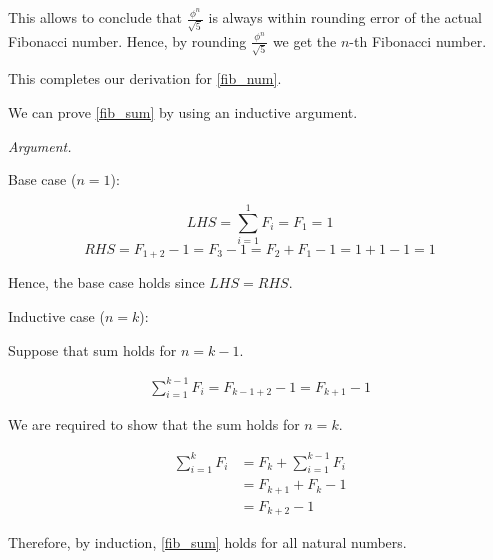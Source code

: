 \documentclass[12pt]{article}
\begin{document}
This allows to conclude that $\frac{\phi^n}{\sqrt{5}}$ is always
within rounding error of the actual Fibonacci number. Hence, by
rounding $\frac{\phi^n}{\sqrt{5}}$ we get the $n$-th Fibonacci
number.

This completes our derivation for \ref{fib_num}.

\vspace{1em}

We can prove \ref{fib_sum} by using an inductive argument.

\vspace{1em}

\textit{Argument.}

Base case ($n = 1$): 

$$LHS = \sum_{i = 1}^{1} F_i = F_1 = 1$$ 
$$RHS = F_{1 + 2} - 1 = F_3 - 1 = F_2 + F_1 - 1 = 1 + 1 - 1 =
1$$

Hence, the base case holds since $LHS = RHS$.

\vspace{1em}

Inductive case ($n = k$):

Suppose that sum holds for $n = k - 1$. 

\begin{align}
  \sum_{i = 1}^{k - 1} F_i = F_{k - 1 + 2} - 1 = F_{k + 1} - 1
  \label{ind_hyp}
\end{align}

We are required to show that the sum holds for $n = k$.

\begin{align*}
  \sum_{i = 1}^{k} F_i & = F_{k} + \sum_{i = 1}^{k - 1} F_i\\
                       & = F_{k + 1} + F_{k} - 1\\
                       & = F_{k + 2} - 1 
\end{align*}

Therefore, by induction, \ref{fib_sum} holds for all natural
numbers.







\printbibliography
\end{document}
